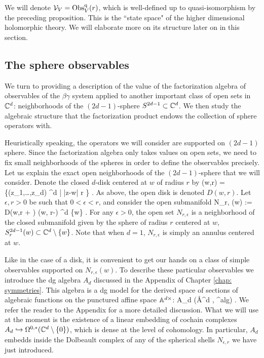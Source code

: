 \documentclass[10pt]{amsart}
\def\Bar{\overline}
\begin{document}
We will denote $\cV_V = \Obs_V^\q(r)$, which is well-defined up to quasi-isomorphism by the preceding proposition. 
This is the ``state space" of the higher dimensional holomorphic theory. 
We will elaborate more on its structure later on in this section.

\subsection{The sphere observables}

We turn to providing a description of the value of the factorization algebra of observables of the $\beta\gamma$ system applied to another important class of open sets in $\CC^d$: neighborhoods of the $(2d-1)$-sphere $S^{2d-1} \subset \CC^d$. 
We then study the algebraic structure that the factorization product endows the collection of sphere operators with.

Heuristically speaking, the operators we will consider are supported on $(2d-1)$ sphere.
Since the factorization algebra only takes values on open sets, we need to fix small neighborhoods of the spheres in order to define the observables precisely.
Let us explain the exact open neighborhoods of the $(2d-1)$-sphere that we will consider.
Denote the closed $d$-disk centered at $w$ of radius $r$ by
\ben
\Bar{D}(w,r) = \left\{(z_1,\ldots,z_d) \in \CC^d \; | \; |z-w| \leq r \right\} . 
\een
As above, the open disk is denoted $D(w,r)$. 
Let $\epsilon,r > 0$ be such that $0 < \epsilon < r$, and consider the open submanifold
\ben
N_{r, \epsilon}(w) := D(w,r + \epsilon) \setminus \Bar{D}(w, r-\epsilon) \subset \CC^d \setminus \{w\} .
\een 
For any $\epsilon > 0$, the open set $N_{r,\epsilon}$ is a neighborhood of the closed submanifold given by the sphere of radius $r$ centered at $w$, $S^{2d-1}_r(w) \subset \CC^d \setminus \{w\}$. 
Note that when $d=1$, $N_{r,\epsilon}$ is simply an annulus centered at $w$. 

Like in the case of a disk, it is convenient to get our hands on a class of simple observables supported on $N_{r,\epsilon}(w)$. 
To describe these particular observables we introduce the dg algebra $A_d$ discussed in the Appendix of Chapter \ref{chap: symmetries}.
This algebra is a dg model for the derived space of sections of algebraic functions on the punctured affine space $\AA^{d \times}$:
\ben 
A_d \simeq \RR \Gamma(\AA^{d \times}, \sO^{alg}) .
\een
We refer the reader to the Appendix for a more detailed discussion.
What we will use at the moment is the existence of a linear embedding of cochain complexes $A_d \hookrightarrow \Omega^{0,*}(\CC^d \setminus \{0\})$, which is dense at the level of cohomology.
In particular, $A_d$ embedds inside the Dolbeault complex of any of the spherical shells $N_{\epsilon,r}$ we have just introduced.
\end{document}
